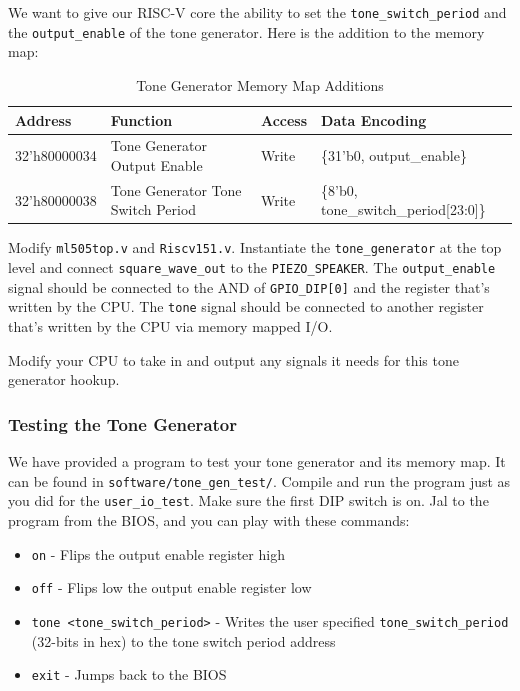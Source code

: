 \documentclass[11pt]{article}
\begin{document}
We want to give our RISC-V core the ability to set the \verb|tone_switch_period| and the \verb|output_enable| of the tone generator. Here is the addition to the memory map:

\begin{table}[hbt]
	\begin{center}
		\caption{Tone Generator Memory Map Additions}
		\label{mem_map2}
		\begin{tabular}{l l l l}
			\toprule
			\textbf{Address} & \textbf{Function} & \textbf{Access} & \textbf{Data Encoding}\\
			\midrule
			32'h80000034 & Tone Generator Output Enable & Write & \{31'b0, output\_enable\} \\
			32'h80000038 & Tone Generator Tone Switch Period & Write & \{8'b0, tone\_switch\_period[23:0]\} \\ \bottomrule
		\end{tabular}
	\end{center}
\end{table}

Modify \verb|ml505top.v| and \verb|Riscv151.v|. Instantiate the \verb|tone_generator| at the top level and connect \verb|square_wave_out| to the \verb|PIEZO_SPEAKER|. The \verb|output_enable| signal should be connected to the AND of \verb|GPIO_DIP[0]| and the register that's written by the CPU. The \verb|tone| signal should be connected to another register that's written by the CPU via memory mapped I/O.

Modify your CPU to take in and output any signals it needs for this tone generator hookup.

\subsubsection{Testing the Tone Generator}
We have provided a program to test your tone generator and its memory map. It can be found in \verb|software/tone_gen_test/|. Compile and run the program just as you did for the \verb|user_io_test|. Make sure the first DIP switch is on. Jal to the program from the BIOS, and you can play with these commands:

\begin{itemize}
	\item \verb|on| - Flips the output enable register high
	\item \verb|off| - Flips low the output enable register low
	\item \verb|tone <tone_switch_period>| - Writes the user specified \verb|tone_switch_period| (32-bits in hex) to the tone switch period address
	\item \verb|exit| - Jumps back to the BIOS
\end{itemize}
\end{document}
